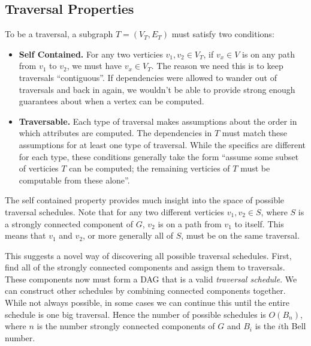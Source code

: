\documentclass[10pt]{article}
\begin{document}
\subsection{Traversal Properties}
To be a traversal, a subgraph $T = (V_T, E_T)$ must satisfy two conditions:
\begin{itemize}
    \item \textbf{Self Contained.} For any two verticies $v_1, v_2 \in V_T$, if $v_x \in V$ is on any path from $v_1$ to $v_2$, we must have $v_x \in V_T$. The reason we need this is to keep traversals ``contiguous''. If dependencies were allowed to wander out of traversals and back in again, we wouldn't be able to provide strong enough guarantees about when a vertex can be computed.
    \item \textbf{Traversable.} Each type of traversal makes assumptions about the order in which attributes are computed. The dependencies in $T$ must match these assumptions for at least one type of traversal. While the specifics are different for each type, these conditions generally take the form ``assume some subset of verticies $T$ can be computed; the remaining verticies of $T$ must be computable from these alone''.
\end{itemize}

The self contained property provides much insight into the space of possible traversal schedules. Note that for any two different verticies $v_1,v_2 \in S$, where $S$ is a strongly connected component of $G$, $v_2$ is on a path from $v_1$ to itself. This means that $v_1$ and $v_2$, or more generally all of $S$, must be on the same traversal. 

This suggests a novel way of discovering all possible traversal schedules. First, find all of the strongly connected components and assign them to traversals. These components now must form a DAG that is a valid \emph{traversal schedule}. We can construct other schedules by combining connected components together. While not always possible, in some cases we can continue this until the entire schedule is one big traversal. Hence the number of possible schedules is
$O(B_n)$, where $n$ is the number strongly connected components of $G$ and $B_i$ is the $i$th Bell number.
\end{document}
